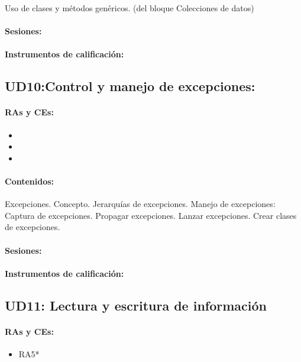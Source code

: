 		Uso de clases y métodos genéricos. (del bloque Colecciones de datos)

	\paragraph{Sesiones:}
	\paragraph{Instrumentos de calificación:}


\newpage
\subsection{UD10:Control y manejo de excepciones:}

	\paragraph{RAs y CEs:}
	\begin{itemize}[itemsep=0.1em, topsep=0.1em]
		\item\RATRESd
		\item\RATRESh
		\item\RATRESi		
	\end{itemize}
	\paragraph{Contenidos:}
		Excepciones. Concepto.
		Jerarquías de excepciones.
		Manejo de excepciones:  Captura de excepciones.  Propagar excepciones.  Lanzar excepciones.  Crear clases de excepciones.


	\paragraph{Sesiones:}
	\paragraph{Instrumentos de calificación:}




\newpage
\subsection{UD11: Lectura y escritura de información}

	\paragraph{RAs y CEs:}
	\begin{itemize}[itemsep=0.1em, topsep=0.1em]
		\item RA5*
	\end{itemize}

